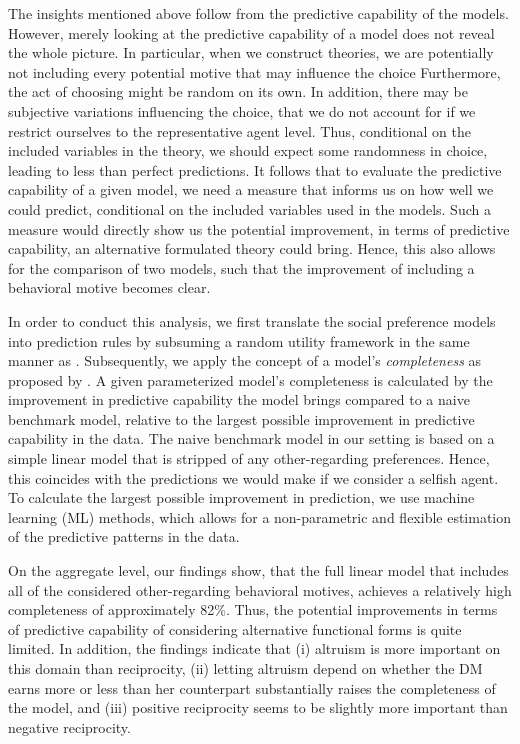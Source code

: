 \documentclass[11pt,a4paper]{article}
\theoremstyle{definition}
\begin{document}
The insights mentioned above follow from the predictive capability of the models. However, merely looking at the predictive capability of a model does not reveal the whole picture. In particular, when we construct theories, we are potentially not including every potential motive that may influence the choice Furthermore, the act of choosing might be random on its own. In addition, there may be subjective variations influencing the choice, that we do not account for if we restrict ourselves to the representative agent level. Thus, conditional on the included variables in the theory, we should expect some randomness in choice, leading to less than perfect predictions. It follows that to evaluate the predictive capability of a given model, we need a measure that informs us on how well we could predict, conditional on the included variables used in the models. Such a measure would directly show us the potential improvement, in terms of predictive capability, an alternative formulated theory could bring. Hence, this also allows for the comparison of two models, such that the improvement of including a behavioral motive becomes clear.

In order to conduct this analysis, we first translate the social preference models into prediction rules by subsuming a random utility framework in the same manner as \cite{Bruhin2019}. Subsequently, we apply the concept of a model's \emph{completeness} as proposed by \cite{Fudenberg2021b}. A given parameterized model's completeness is calculated by the improvement in predictive capability the model brings compared to a naive benchmark model, relative to the largest possible improvement in predictive capability in the data. The naive benchmark model in our setting is based on a simple linear model that is stripped of any other-regarding preferences. Hence, this coincides with the predictions we would make if we consider a selfish agent. To calculate the largest possible improvement in prediction, we use machine learning (ML) methods, which allows for a non-parametric and flexible estimation of the predictive patterns in the data.

On the aggregate level, our findings show, that the full linear model that includes all of the considered other-regarding behavioral motives, achieves a relatively high completeness of approximately 82\%. Thus, the potential improvements in terms of predictive capability of considering alternative functional forms is quite limited. In addition, the findings indicate that (i) altruism is more important on this domain than reciprocity, (ii) letting altruism depend on whether the DM earns more or less than her counterpart substantially raises the completeness of the model, and (iii) positive reciprocity seems to be slightly more important than negative reciprocity.
\end{document}
